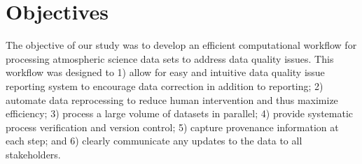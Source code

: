 \section{Objectives}
The objective of our study was to develop an efficient computational
workflow for processing atmospheric science data sets to address data
quality issues. This workflow was designed to 1) allow for easy and intuitive
data quality issue reporting system to encourage data correction in
addition to reporting; 2) automate data reprocessing to reduce
human intervention and thus maximize efficiency; 3)
process a large volume of datasets in parallel; 4) provide systematic process verification and
version control; 5) capture provenance information at each step; and 6)
clearly communicate  any updates to the data to all stakeholders.

